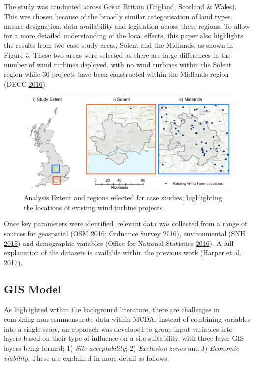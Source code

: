 \documentclass[a4paper,]{article}
\theoremstyle{definition}
\theoremstyle{definition}
\theoremstyle{remark}
\begin{document}
{The study was conducted across Great Britain (England, Scotland \&
Wales). This was chosen because of the broadly similar categorisation of
land types, nature designation, data availability and legislation across
these regions. To allow for a more detailed understanding of the local
effects, this paper also highlights the results from two case study
areas, Solent and the Midlands, as shown in Figure 3. These two areas
were selected as there are large differences in the number of wind
turbines deployed, with no wind turbines within the Solent region while
30 projects have been constructed within the Midlands region (DECC
\protect\hyperlink{ref-DECC2016}{2016}).

\begin{figure}[!h]
\includegraphics[width=1\linewidth]{figures/StudyExtent} \caption{Analysis Extent and regions selected for case studies, highlighting the locations of existing wind turbine projects}\label{fig:StudyExtent}
\end{figure}

Once key parameters were identified, relevant data was collected from a
range of sources for geospatial (OSM
\protect\hyperlink{ref-Overpass2016}{2016}; Ordnance Survey
\protect\hyperlink{ref-Survey2016}{2016}), environmental (SNH
\protect\hyperlink{ref-SNH2015}{2015}) and demographic variables (Office
for National Statistics
\protect\hyperlink{ref-OfficeforNationalStatistics}{2016}). A full
explanation of the datasets is available within the previous work
(Harper et al. \protect\hyperlink{ref-Harper2017}{2017}).

\subsection{GIS Model}\label{gis-model}

As highlighted within the background literature, there are challenges in
combining non-commensurate data within MCDA. Instead of combining
variables into a single score, an approach was developed to group input
variables into layers based on their type of influence on a site
suitability, with three layer GIS layers being formed; 1) \emph{Site
acceptability}; 2) \emph{Exclusion zones} and 3) \emph{Economic
viability}. These are explained in more detail as follows.

}
\end{document}
